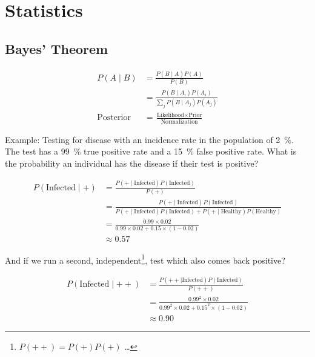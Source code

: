 \chapter{Statistics}
\label{chap:stats}

\section{Bayes' Theorem}
\label{stats:Bayes}

\begin{equation}\label{eq:stats:Bayes}
\begin{split}
P\left(A \mid B\right) &= \frac{P\left(B \mid A\right) P\left(A\right)}{P\left(B\right)} \\
&= \frac{P\left(B \mid A_{i}\right) P\left(A_{i}\right)}{\sum_{j} P\left(B \mid A_{j}\right)P\left(A_{j}\right)} \\
\text{Posterior} &= \frac{\text{Likelihood} \times \text{Prior}}{\text{Normalization}}
\end{split}
\end{equation}

Example: Testing for disease with an incidence rate in the population of \SI{2}{\percent}.
The test has a \SI{99}{\percent} true positive rate and a \SI{15}{\percent} false positive rate.
What is the probability an individual has the disease if their test is positive?

\begin{equation}\label{eq:stats:BayesEx}
\begin{split}
P\left(\text{Infected} \mid +\right) &= \frac{P\left(+ \mid \text{Infected}\right) P\left(\text{Infected}\right)}{P\left(+\right)} \\
 &= \frac{P\left(+ \mid \text{Infected}\right) P\left(\text{Infected}\right)}{
P\left(+ \mid \text{Infected}\right)P\left(\text{Infected}\right) + P\left(+ \mid \text{Healthy}\right)P\left(\text{Healthy}\right)} \\
&= \frac{\num{0.99} \times \num{0.02}}{\num{0.99} \times \num{0.02} + \num{0.15} \times \left(1-\num{0.02}\right)} \\
&\approx \num{0.57}
\end{split}
\end{equation}

\noindent And if we run a second, independent\footnote{$P\left(++\right) = P\left(+\right)P\left(+\right)$ \ldots}, test which also comes back positive?

\begin{equation}\label{eq:stats:BayesEx2}
\begin{split}
P\left(\text{Infected} \mid ++\right) &= \frac{P\left(++ \mid \text{Infected}\right) P\left(\text{Infected}\right)}{P\left(++\right)} \\
&= \frac{\num{0.99}^{2} \times \num{0.02}}{\num{0.99}^{2} \times \num{0.02} + \num{0.15}^{2} \times \left(1-\num{0.02}\right)} \\
&\approx \num{0.90}
\end{split}
\end{equation}

